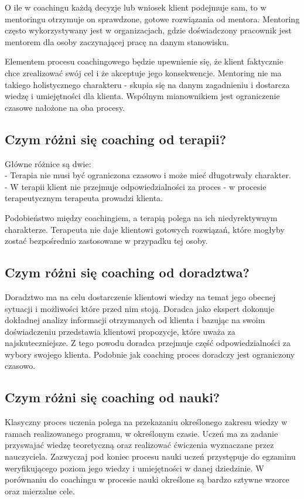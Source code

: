 O ile w coachingu każdą decyzje lub wniosek klient podejmuje sam, to w mentoringu otrzymuje on sprawdzone, gotowe rozwiązania od mentora.
Mentoring często wykorzystywany jest w organizacjach, gdzie doświadczony pracownik jest mentorem dla osoby zaczynającej pracę na danym stanowisku.

Elementem procesu coachingowego będzie upewnienie się, że klient faktycznie chce zrealizować swój cel i że akceptuje jego konsekwencje.
Mentoring nie ma takiego holistycznego charakteru - skupia się na danym zagadnieniu i dostarcza wiedzę i umiejętności dla klienta.
Wspólnym mianownikiem jest ograniczenie czasowe nałożone na oba procesy.

\subsection{Czym różni się coaching od terapii?}
Główne różnice są dwie: \\
- Terapia nie musi być ograniczona czasowo i może mieć długotrwały charakter. \\
- W terapii klient nie przejmuje odpowiedzialności za proces - w procesie terapeutycznym terapeuta prowadzi klienta.

Podobieństwo między coachingiem, a terapią polega na ich niedyrektywnym charakterze. Terapeuta nie daje klientowi gotowych rozwiązań, które mogłyby
zostać bezpośrednio zastosowane w przypadku tej osoby.

\subsection{Czym różni się coaching od doradztwa?}
Doradztwo ma na celu dostarczenie klientowi wiedzy na temat jego obecnej sytuacji i możliwości które przed nim stoją. Doradca jako ekspert dokonuje
dokładnej analizy informacji otrzymanych od klienta i bazując na swoim doświadczeniu przedstawia klientowi propozycje, które uważa za najskuteczniejsze.
Z tego powodu doradca przejmuje część odpowiedzialności za wybory swojego klienta. Podobnie jak coaching proces doradczy jest ograniczony czasowo.

\subsection{Czym różni się coaching od nauki?}

Klasyczny proces uczenia polega na przekazaniu określonego zakresu wiedzy w ramach realizowanego programu, w określonym czasie. Uczeń ma za zadanie
przyswajać wiedzę teoretyczną oraz realizować ćwiczenia wyznaczane przez nauczyciela. Zazwyczaj pod koniec procesu nauki uczeń przystępuje do egzaminu
weryfikującego poziom jego wiedzy i umiejętności w danej dziedzinie. W porównaniu do coachingu w procesie nauki określone są bardzo sztywne wzorce
oraz mierzalne cele.


